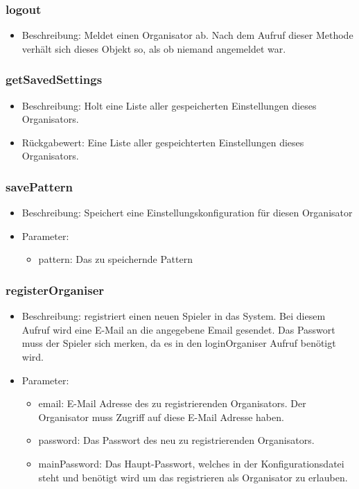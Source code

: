 \documentclass[a4paper]{scrreprt}
\begin{document}
	\subsubsection{logout}
	\begin{itemize}
		\item Beschreibung: Meldet einen Organisator ab. Nach dem Aufruf dieser Methode verhält sich dieses Objekt so, als ob niemand angemeldet war.
	\end{itemize}
	\subsubsection{getSavedSettings}
	\begin{itemize}
		\item Beschreibung: Holt eine Liste aller gespeicherten Einstellungen dieses Organisators.
		\item Rückgabewert: Eine Liste aller gespeichterten Einstellungen dieses Organisators.
	\end{itemize}
	\subsubsection{savePattern}
	\begin{itemize}
		\item Beschreibung: Speichert eine Einstellungskonfiguration für diesen Organisator
		\item Parameter:
		\begin{itemize}
			\item pattern: Das zu speichernde Pattern
		\end{itemize}
	\end{itemize}
	\subsubsection{registerOrganiser}
	\begin{itemize}
		\item Beschreibung: registriert einen neuen Spieler in das System. Bei diesem Aufruf wird eine E-Mail an die angegebene Email gesendet. Das Passwort muss der Spieler sich merken, da es in den loginOrganiser Aufruf benötigt wird.
		\item Parameter:
		\begin{itemize}
			\item email: E-Mail Adresse des zu registrierenden Organisators. Der Organisator muss Zugriff auf diese E-Mail Adresse haben.
			\item password: Das Passwort des neu zu registrierenden Organisators.
			\item mainPassword: Das Haupt-Passwort, welches in der Konfigurationsdatei steht und benötigt wird um das registrieren als Organisator zu erlauben.
		\end{itemize}
	\end{itemize}
\end{document}
